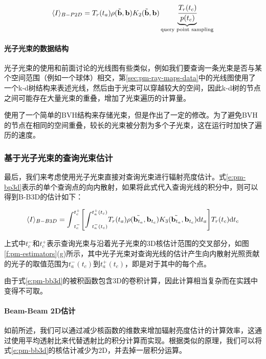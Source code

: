 \begin{equation}\label{e:pm-bp2d}
	\langle I\rangle_{B-P2D}=T_r(t_a)\rho(\tilde{\mathbf{b}},\mathbf{b})K_2(\tilde{\mathbf{b}},\mathbf{b})\underbrace{ \cfrac{T_r(t_c)}{p(t_c)}}_{\text{query point sampling}}
\end{equation}




\paragraph{光子光束的数据结构}
光子光束的使用和前面讨论的光线图有些类似，例如我们要查询一条光束是否与某个空间范围（例如一个球体）相交，第\ref{sec:pm-ray-maps-data}中的光线图使用了一个k-d树结构来表述光线，然后由于光束可以穿越较大的空间，因此k-d树的节点之间可能存在大量光束的重叠，增加了光束遍历的计算量。

\cite{a:AComprehensiveTheoryofVolumetricRadianceEstimationusingPhotonPointsandBeams}使用了一个简单的BVH结构来存储光束，但是作出了一定的修改。为了避免BVH的节点在相同的空间重叠，较长的光束被分割为多个子光束，这在运行时加快了遍历的速度。





\subsubsection{基于光子光束的查询光束估计}\label{sec:pm-beam-based-estimator}
最后，我们来考虑使用光子光束直接对查询光束进行辐射亮度估计。式\ref{e:pm-bp3d}表示的单个查询点的向内散射，如果将此式代入查询光线的积分中，则可以得到B-B3D的估计如下：

\begin{equation}\label{e:pm-bb3d}
	\langle I\rangle_{B-B3D}={\rm \int}^{t^{+}_{c}}_{t^{-}_{c}}\Biggl[{\rm \int}^{t^{+}_{a}(t_c)}_{t^{-}_{a}(t_c)}T_r(t_a) \rho(\tilde{\mathbf{b}_{t_a}},\mathbf{b}_{t_c})K_3(\tilde{\mathbf{b}_{t_a}},\mathbf{b}_{t_c}){\rm d}t_a\Biggl]T_r(t_c){\rm d}t_c
\end{equation}

上式中$t^{-}_c$和$t^{+}_c$表示查询光束与沿着光子光束的3D核估计范围的交叉部分，如图\ref{f:pm-estimators}(g)所示，其中光子光束对查询光线的估计产生向内散射光照贡献的光子的取值范围为$t^{-}_a(t_c)$到$t^{+}_a(t_c)$，即是对于其中的每个点。

由于式\ref{e:pm-bb3d}的被积函数包含3D的卷积计算，因此计算相当复杂而在实践中变得不可取。




\paragraph{Beam-Beam 2D估计}
如前所述，我们可以通过减少核函数的维数来增加辐射亮度估计的计算效率，这通过使用平均透射比来代替透射比的积分计算而实现。根据类似的原理，我们可以将式\ref{e:pm-bb3d}的核估计减少为2D，并去掉一层积分运算。

